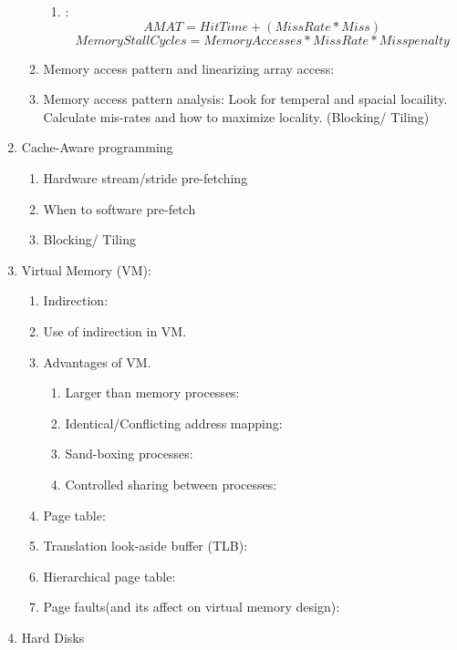 \documentclass[12pt]{article}
\renewcommand{\=}[1]{\stackrel{#1}{=}} %
\theoremstyle{definition}
\theoremstyle{remark}
\begin{document}
\begin{center}
\begin{enumerate}
\begin{enumerate}
      \begin{enumerate}
      \item :
        \begin{equation}
          \label{eq: AMAT}
         AMAT = HitTime + (MissRate * Miss) 
        \end{equation}
        \begin{equation}
          MemoryStallCycles = MemoryAccesses * MissRate * Miss penalty
        \end{equation}
      \end{enumerate}
    \item Memory access pattern and linearizing array access: 
    \item Memory access pattern analysis: Look for temperal and
      spacial locaility. Calculate mis-rates and how to maximize
      locality. (Blocking/ Tiling)
    \end{enumerate}
  \item Cache-Aware programming
    \begin{enumerate}
    \item Hardware stream/stride pre-fetching
    \item When to software pre-fetch
    \item Blocking/ Tiling
    \end{enumerate}
  \item Virtual Memory (VM):
    \begin{enumerate}
    \item Indirection:
    \item Use of indirection in VM.
    \item Advantages of VM.
      \begin{enumerate}
      \item Larger than memory processes: 
      \item Identical/Conflicting address mapping:
      \item Sand-boxing processes:
      \item Controlled sharing between processes:
      \end{enumerate}
    \item Page table:
    \item Translation look-aside buffer (TLB):
    \item Hierarchical page table:
    \item Page faults(and its affect on virtual memory design):
    \end{enumerate}
  \item Hard Disks

\end{enumerate}
\end{center}
\end{document}
